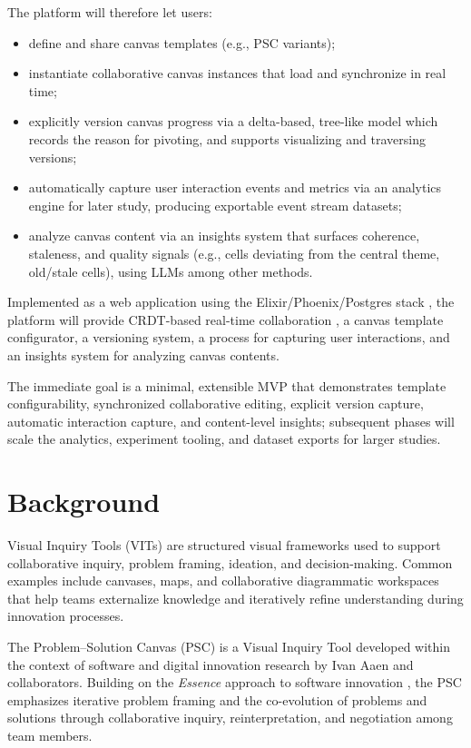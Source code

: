 \documentclass[11pt,a4paper]{article}
\begin{document}
The platform will therefore let users:
\begin{itemize}
  \item define and share canvas templates (e.g., PSC variants);
  \item instantiate collaborative canvas instances that load and synchronize in real time;
  \item explicitly version canvas progress via a delta-based, tree-like model which records the reason for pivoting, and supports visualizing and traversing versions;
  \item automatically capture user interaction events and metrics via an analytics engine for later study, producing exportable event stream datasets;
  \item analyze canvas content via an insights system that surfaces coherence, staleness, and quality signals (e.g., cells deviating from the central theme, old/stale cells), using LLMs among other methods.
\end{itemize}

Implemented as a web application using the Elixir/Phoenix/Postgres stack \citep{elixir,phoenix,liveview}, the platform will provide CRDT-based real-time collaboration \citep{delta_crdt}, a canvas template configurator, a versioning system, a process for capturing user interactions, and an insights system for analyzing canvas contents.

The immediate goal is a minimal, extensible MVP that demonstrates template configurability, synchronized collaborative editing, explicit version capture, automatic interaction capture, and content-level insights; subsequent phases will scale the analytics, experiment tooling, and dataset exports for larger studies.

\section{Background}

Visual Inquiry Tools (VITs) are structured visual frameworks used to support collaborative inquiry, problem framing, ideation, and decision-making. Common examples include canvases, maps, and collaborative diagrammatic workspaces that help teams externalize knowledge and iteratively refine understanding during innovation processes.

The Problem--Solution Canvas (PSC) is a Visual Inquiry Tool developed within the context of software and digital innovation research by Ivan Aaen and collaborators. Building on the \emph{Essence} approach to software innovation \citep{aaen2008essence,aaen2012essence}, the PSC emphasizes iterative problem framing and the co-evolution of problems and solutions through collaborative inquiry, reinterpretation, and negotiation among team members.
\end{document}
